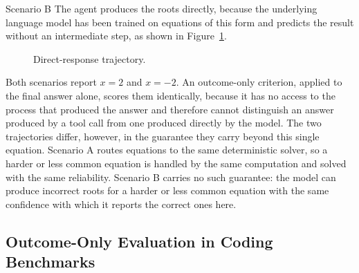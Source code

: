 \begin{scenariobox}{Scenario B}
  The agent produces the roots directly, because the underlying language model has been trained on equations of this form and predicts the result without an intermediate step, as shown in Figure~\ref{fig:quadratic-direct}.

  \begin{figure}[H]
    \centering
    \caption[Direct-response trajectory]{Direct-response trajectory.}
    \label{fig:quadratic-direct}
  \end{figure}
\end{scenariobox}

Both scenarios report $x = 2$ and $x = -2$. An outcome-only criterion, applied to the final answer alone, scores them identically, because it has no access to the process that produced the answer and therefore cannot distinguish an answer produced by a tool call from one produced directly by the model. The two trajectories differ, however, in the guarantee they carry beyond this single equation. Scenario A routes equations to the same deterministic solver, so a harder or less common equation is handled by the same computation and solved with the same reliability. Scenario B carries no such guarantee: the model can produce incorrect roots for a harder or less common equation with the same confidence with which it reports the correct ones here.

\subsection{Outcome-Only Evaluation in Coding Benchmarks}
\label{subsec:coding-benchmarks-outcome-only}


